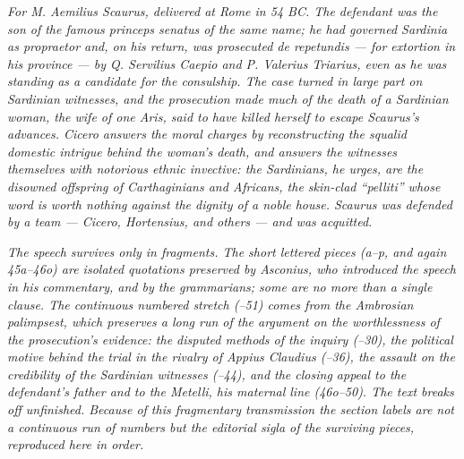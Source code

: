 
\textit{For M. Aemilius Scaurus, delivered at Rome in
54 BC. The defendant was the son of the famous princeps
senatus of the same name; he had governed Sardinia as
propraetor and, on his return, was prosecuted de
repetundis --- for extortion in his province --- by Q.
Servilius Caepio and P. Valerius Triarius, even as he
was standing as a candidate for the consulship. The
case turned in large part on Sardinian witnesses, and
the prosecution made much of the death of a Sardinian
woman, the wife of one Aris, said to have killed
herself to escape Scaurus's advances. Cicero answers
the moral charges by reconstructing the squalid
domestic intrigue behind the woman's death, and answers
the witnesses themselves with notorious ethnic
invective: the Sardinians, he urges, are the disowned
offspring of Carthaginians and Africans, the
skin-clad ``pelliti'' whose word is worth nothing
against the dignity of a noble house. Scaurus was
defended by a team --- Cicero, Hortensius, and others
--- and was acquitted.}

\textit{The speech survives only in fragments. The
short lettered pieces (\textsection a--p, and again
\textsection 45a--46o) are isolated quotations
preserved by Asconius, who introduced the speech in his
commentary, and by the grammarians; some are no more
than a single clause. The continuous numbered stretch
(--51) comes from the Ambrosian
palimpsest, which preserves a long run of the argument
on the worthlessness of the prosecution's evidence: the
disputed methods of the inquiry (--30),
the political motive behind the trial in the rivalry of
Appius Claudius (--36), the assault on
the credibility of the Sardinian witnesses
(--44), and the closing appeal to the
defendant's father and to the Metelli, his maternal
line (\textsection 46o--50). The text breaks off
unfinished. Because of this fragmentary transmission
the section labels are not a continuous run of numbers
but the editorial sigla of the surviving pieces,
reproduced here in order.}
